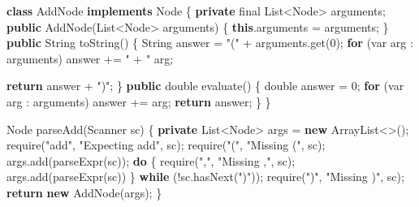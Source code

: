 \documentclass[
]{book}
\newenvironment{Shaded}{\begin{snugshade}}{\end{snugshade}}
\newcommand{\BuiltInTok}[1]{#1}
\newcommand{\DataTypeTok}[1]{\textcolor[rgb]{0.13,0.29,0.53}{#1}}
\newcommand{\DecValTok}[1]{\textcolor[rgb]{0.00,0.00,0.81}{#1}}
\newcommand{\FunctionTok}[1]{\textcolor[rgb]{0.00,0.00,0.00}{#1}}
\newcommand{\KeywordTok}[1]{\textcolor[rgb]{0.13,0.29,0.53}{\textbf{#1}}}
\newcommand{\NormalTok}[1]{#1}
\newcommand{\StringTok}[1]{\textcolor[rgb]{0.31,0.60,0.02}{#1}}
\begin{document}
\begin{Shaded}
\begin{Highlighting}[]
\KeywordTok{class}\NormalTok{ AddNode }\KeywordTok{implements} \BuiltInTok{Node}\NormalTok{ \{}
  \KeywordTok{private} \DataTypeTok{final} \BuiltInTok{List}\NormalTok{\textless{}}\BuiltInTok{Node}\NormalTok{\textgreater{} arguments;}
  \KeywordTok{public} \FunctionTok{AddNode}\NormalTok{(}\BuiltInTok{List}\NormalTok{\textless{}}\BuiltInTok{Node}\NormalTok{\textgreater{} arguments) \{}
    \KeywordTok{this}\NormalTok{.}\FunctionTok{arguments}\NormalTok{ = arguments;}
\NormalTok{  \}}
  \KeywordTok{public} \BuiltInTok{String} \FunctionTok{toString}\NormalTok{() \{}
    \BuiltInTok{String}\NormalTok{ answer = }\StringTok{"("}\NormalTok{ + arguments.}\FunctionTok{get}\NormalTok{(}\DecValTok{0}\NormalTok{);}
    \KeywordTok{for}\NormalTok{ (var arg : arguments)}
\NormalTok{      answer += }\StringTok{" + "}\NormalTok{ arg;}
    
    \KeywordTok{return}\NormalTok{ answer + }\StringTok{")"}\NormalTok{;}
\NormalTok{  \}}
  \KeywordTok{public} \DataTypeTok{double} \FunctionTok{evaluate}\NormalTok{() \{}
    \DataTypeTok{double}\NormalTok{ answer = }\DecValTok{0}\NormalTok{;}
    \KeywordTok{for}\NormalTok{ (var arg : arguments)}
\NormalTok{      answer += arg;}
     \KeywordTok{return}\NormalTok{ answer;}
\NormalTok{  \}}
\NormalTok{ \}}
 
\BuiltInTok{Node} \FunctionTok{parseAdd}\NormalTok{(}\BuiltInTok{Scanner}\NormalTok{ sc) \{}
  \KeywordTok{private} \BuiltInTok{List}\NormalTok{\textless{}}\BuiltInTok{Node}\NormalTok{\textgreater{} args = }\KeywordTok{new} \BuiltInTok{ArrayList}\NormalTok{\textless{}\textgreater{}();}
  \FunctionTok{require}\NormalTok{(}\StringTok{"add"}\NormalTok{, }\StringTok{"Expecting add"}\NormalTok{, sc);}
  \FunctionTok{require}\NormalTok{(}\StringTok{"("}\NormalTok{, }\StringTok{"Missing \textquotesingle{}(\textquotesingle{}"}\NormalTok{, sc);}
\NormalTok{  args.}\FunctionTok{add}\NormalTok{(}\FunctionTok{parseExpr}\NormalTok{(sc));}
  \KeywordTok{do}\NormalTok{ \{}
    \FunctionTok{require}\NormalTok{(}\StringTok{","}\NormalTok{, }\StringTok{"Missing \textquotesingle{},\textquotesingle{}"}\NormalTok{, sc);}
\NormalTok{    args.}\FunctionTok{add}\NormalTok{(}\FunctionTok{parseExpr}\NormalTok{(sc))}
\NormalTok{  \} }\KeywordTok{while}\NormalTok{ (!sc.}\FunctionTok{hasNext}\NormalTok{(}\StringTok{")"}\NormalTok{));}
  \FunctionTok{require}\NormalTok{(}\StringTok{")"}\NormalTok{, }\StringTok{"Missing \textquotesingle{})\textquotesingle{}"}\NormalTok{, sc);}
  \KeywordTok{return} \KeywordTok{new} \FunctionTok{AddNode}\NormalTok{(args);}
\NormalTok{\}}
\end{Highlighting}
\end{Shaded}
\end{document}
